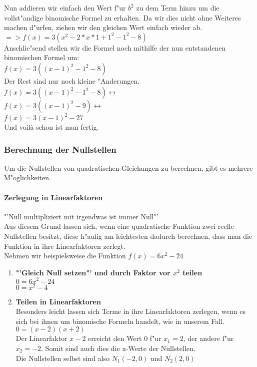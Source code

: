 Nun addieren wir einfach den Wert f"ur $b^2$ zu dem Term hinzu um die vollst"andige binomische Formel zu erhalten. Da wir dies nicht ohne Weiteres machen d"urfen, ziehen wir den gleichen Wert einfach wieder ab.\\
$=> f(x)=3(x^2 - 2*x*1 +1^2 -1^2 -8)$\\
Anschlie"send stellen wir die Formel noch mithilfe der nun entstandenen binomischen Formel um:\\
$f(x)=3((x-1)^2-1^2-8)$\\
Der Rest sind nur noch kleine "Anderungen.\\
$f(x)=3((x-1)^2-1^2-8) \leftrightarrow$\\
$f(x)=3((x-1)^2-9) \leftrightarrow$\\
$f(x)=3(x-1)^2-27$\\
Und voil\`a schon ist man fertig.

\subsubsection{Berechnung der Nullstellen}
Um die Nullstellen von quadratischen Gleichungen zu berechnen, gibt es mehrere M"oglichkeiten.\\

\paragraph{Zerlegung in Linearfaktoren}\hspace{12 cm}
"'Null multipliziert mit irgendwas ist immer Null"'\\
Aus diesem Grund lassen sich, wenn eine quadratische Funktion zwei reelle Nullstellen besitzt, diese h"aufig am leichtesten dadurch berechnen, dass man die Funktion in ihre Linearfaktoren zerlegt.\vspace{0.5 cm}\\
Nehmen wir beispielsweise die Funktion $f(x)=6x^2 - 24$\\
\begin{enumerate}
\item \textbf{"'Gleich Null setzen"' und durch Faktor vor $x^2$ teilen}\\
$0=6x^2 - 24$\\
$0=x^2 - 4$
\item \textbf{Teilen in Linearfaktoren}\\
Besonders leicht lassen sich Terme in ihre Linearfaktoren zerlegen, wenn es sich bei ihnen um binomische Formeln handelt, wie in unserem Fall.\\
$0=(x-2)(x+2)$\\
Der Linearfaktor $x-2$ erreicht den Wert 0 f"ur $x_1=2$, der andere f"ur $x_2=-2$. Somit sind auch dies die x-Werte der Nullstellen.\\
Die Nullstellen selbst sind also $N_1(-2,0)$ und $N_2(2,0)$
\end{enumerate}

